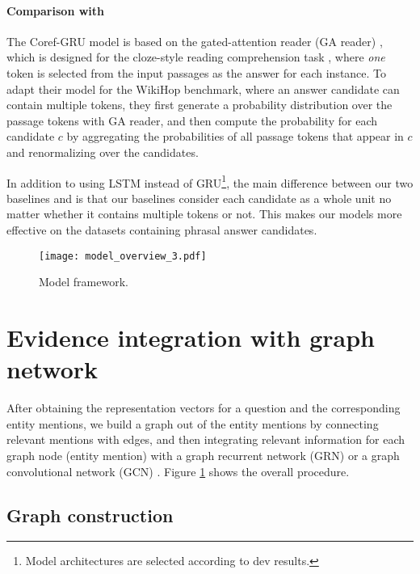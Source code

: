 \documentclass[letterpaper]{article}
\begin{document}
\paragraph{Comparison with \citet{N18-2007}}
The Coref-GRU model \citep{N18-2007} is based on the gated-attention reader (GA reader) \citep{dhingra-EtAl:2017:Long2}, which is designed for the cloze-style reading comprehension task \citep{hermann2015teaching}, where \emph{one} token is selected from the input passages as the answer for each instance.
To adapt their model for the WikiHop benchmark, where an answer candidate can contain multiple tokens, they first generate a probability distribution over the passage tokens with GA reader, and then compute the probability for each candidate $c$ by aggregating the probabilities of all passage tokens that appear in $c$ and renormalizing over the candidates.




In addition to using LSTM instead of GRU\footnote{Model architectures are selected according to dev results.}, the main difference between our two baselines and \citet{N18-2007} is that our baselines consider each candidate as a whole unit no matter whether it contains multiple tokens or not. 
This makes our models more effective on the datasets containing phrasal answer candidates.

\begin{figure}
\centering
\texttt{[image: model\_overview\_3.pdf]}
\vspace{-0.5em}
\caption{Model framework.}
\label{fig:model_overview}
\vspace{-1.0em}
\end{figure}


\section{Evidence integration with graph network}


After obtaining the representation vectors for a question and the corresponding entity mentions, we build a graph out of the entity mentions by connecting relevant mentions with edges, and then integrating relevant information for each graph node (entity mention) with a graph recurrent network (GRN) \citep{P18-1030,P18-1150} or a graph convolutional network (GCN) \citep{kipf2017semi}.
Figure \ref{fig:model_overview} shows the overall procedure.

\subsection{Graph construction}
\end{document}

